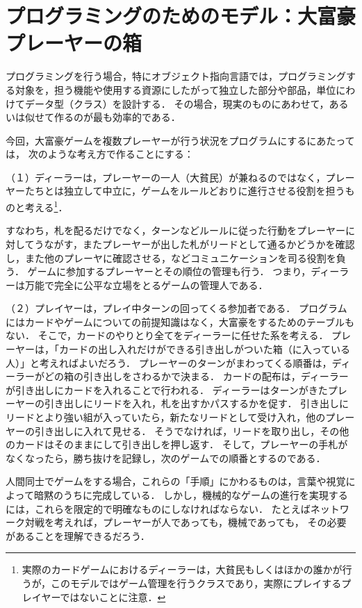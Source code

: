\section{プログラミングのためのモデル：大富豪プレーヤーの箱}
プログラミングを行う場合，特にオブジェクト指向言語では，プログラミングする対象を，担う機能や使用する資源にしたがって独立した部分や部品，単位にわけてデータ型（クラス）を設計する．
その場合，現実のものにあわせて，あるいは似せて作るのが最も効率的である．

今回，大富豪ゲームを複数プレーヤーが行う状況をプログラムにするにあたっては，
次のような考え方で作ることにする：

（１）ディーラーは，プレーヤーの一人（大貧民）が兼ねるのではなく，プレーヤーたちとは独立して中立に，ゲームをルールどおりに進行させる役割を担うものと考える\footnote{実際のカードゲームにおけるディーラーは，大貧民もしくはほかの誰かが行うが，このモデルではゲーム管理を行うクラスであり，実際にプレイするプレイヤーではないことに注意．}．

すなわち，札を配るだけでなく，ターンなどルールに従った行動をプレーヤーに対してうながす，またプレーヤーが出した札がリードとして通るかどうかを確認し，また他のプレーヤに確認させる，などコミュニケーションを司る役割を負う．
ゲームに参加するプレーヤーとその順位の管理も行う．
つまり，ディーラーは万能で完全に公平な立場をとるゲームの管理人である．

（２）プレイヤーは，プレイ中ターンの回ってくる参加者である．
プログラムにはカードやゲームについての前提知識はなく，大富豪をするためのテーブルもない．
そこで，カードのやりとり全てをディーラーに任せた系を考える．
プレーヤーは，「カードの出し入れだけができる引き出しがついた箱（に入っている人）」と考えればよいだろう．
プレーヤーのターンがまわってくる順番は，ディーラーがどの箱の引き出しをさわるかで決まる．
カードの配布は，ディーラーが引き出しにカードを入れることで行われる．
ディーラーはターンがきたプレーヤーの引き出しにリードを入れ，札を出すかパスするかを促す．
引き出しにリードとより強い組が入っていたら，新たなリードとして受け入れ，他のプレーヤーの引き出しに入れて見せる．
そうでなければ，リードを取り出し，その他のカードはそのままにして引き出しを押し返す．
そして，プレーヤーの手札がなくなったら，勝ち抜けを記録し，次のゲームでの順番とするのである．

人間同士でゲームをする場合，これらの「手順」にかわるものは，言葉や視覚によって暗黙のうちに完成している．
しかし，機械的なゲームの進行を実現するには，これらを限定的で明確なものにしなければならない．
たとえばネットワーク対戦を考えれば，プレーヤーが人であっても，機械であっても，
その必要があることを理解できるだろう．


